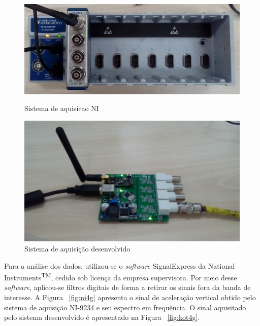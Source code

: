 \documentclass[
	12pt,				%
	openright,			%
	twoside,			%
	a4paper,			%
	english,			%
	french,				%
	spanish,			%
	brazil,				%
	]{abntex2}
\begin{document}
		\begin{figure}[H]
			\centering
			\begin{minipage}{0.4\linewidth}
				\centering
				\includegraphics[width = \linewidth]{../Fotos/cdaq.jpg}
				\caption{Sistema de aquisicao NI}
				\label{fig:modulosNI}
			\end{minipage}
			\hfill\vline\hfill
			\begin{minipage}{0.4\linewidth}
				\centering
				\includegraphics[width = \linewidth]{../Fotos/DAqIEPE.jpg}
				\caption{Sistema de aquisição desenvolvido}
				\label{fig:daqIepe}
			\end{minipage}
		\end{figure}

		Para a análise dos dados, utilizou-se o \textit{software} SignalExpress da National Instruments\textsuperscript{TM}, cedido sob licença da empresa supervisora. Por meio desse \textit{software}, aplicou-se filtros digitais de forma a retirar os sinais fora da banda de interesse. A Figura ~\ref{fig:ni4g} apresenta o sinal de aceleração vertical obtido pelo sistema de aquisição NI-9234 e seu espectro em frequência. O sinal aquisitado pelo sistema desenvolvido é apresentado na Figura ~\ref{fig:kot4g}.
\end{document}
